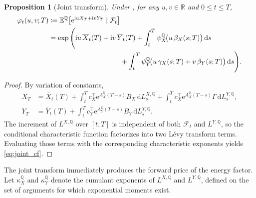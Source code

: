 \documentclass[10pt,a4paper,reqno]{amsart}
\newtheorem{proposition}[theorem]{Proposition}
\newcommand{\R}{\mathbb{R}}
\newcommand{\E}{\mathbb{E}}
\newcommand{\Q}{\mathbb{Q}}
\newcommand{\F}{\mathcal{F}}
\newcommand{\1}{\mathbbm{1}}
\newcommand{\dd}{\mathrm{d}}
\newcommand{\ii}{\mathrm{i}}
\newcommand{\ee}{\mathrm{e}}
\begin{document}
\begin{proposition}[Joint transform]
\label{prop:joint_cf}
Under , for any \(u,v \in \R\) and \(0 \le t \le T\),
\begin{align}
  \varphi_t(u,v;T)
  &\coloneqq \E^\Q\!\left[
      \ee^{\ii u X_T + \ii v Y_T}
      \mid \F_t
    \right] \nonumber\\
  &= \exp\Bigg(
      \ii u\, \overline{X}_t(T)
      + \ii v\, \overline{Y}_t(T)
      + \int_t^T \psi_X^\Q\!\big(u\,\beta_X(s;T)\big)\,\dd s
      \nonumber\\
      &\hspace{3.6cm}
      + \int_t^T \psi_Y^\Q\!\big(
          u\,\gamma_X(s;T)
          + v\,\beta_Y(s;T)
        \big)\,\dd s
    \Bigg).
    \label{eq:joint_cf}
\end{align}
\end{proposition}

\begin{proof}
By variation of constants,
\begin{align*}
  X_T
  &= \overline{X}_t(T)
     + \int_t^T c_X^\top \ee^{A_X^\Q(T-s)} B_X\,\dd L_s^{X,\Q}
     + \int_t^T c_X^\top \ee^{A_X^\Q(T-s)} \Gamma\,\dd L_s^{Y,\Q},\\
  Y_T
  &= \overline{Y}_t(T)
     + \int_t^T c_Y^\top \ee^{A_Y^\Q(T-s)} B_Y\,\dd L_s^{Y,\Q}.
\end{align*}
The increment of \(L^{X,\Q}\) over \([t,T]\) is independent of both \(\F_t\)
and \(L^{Y,\Q}\), so the conditional characteristic function factorizes into two
Lévy transform terms. Evaluating those terms with the corresponding
characteristic exponents yields \eqref{eq:joint_cf}.
\end{proof}

The joint transform immediately produces the forward price of the energy factor.
Let \(\kappa_X^\Q\) and \(\kappa_Y^\Q\) denote the cumulant exponents of
\(L^{X,\Q}\) and \(L^{Y,\Q}\), defined on the set of arguments for which
exponential moments exist.
\end{document}
